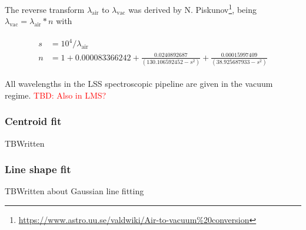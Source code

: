 The reverse transform $\lambda_\textrm{air}$ to $\lambda_\textrm{vac}$ was derived by N. Piskunov\footnote{\url{https://www.astro.uu.se/valdwiki/Air-to-vacuum\%20conversion}}, being $\lambda_\textrm{vac}=\lambda_\textrm{air}*n$ with 

\begin{eqnarray}\label{eq:vac2air}
\left.\begin{aligned}
    s&=10^4 / \lambda_{\textrm{air}}\\
    n&=1 + 0.000083366242 + \frac{0.0240892687}{(130.106592452 - s^2)} + \frac{0.00015997409}{(38.925687933 - s^2)}
\end{aligned}\right.
\end{eqnarray}

All wavelengths in the \ac{LSS} spectroscopic pipeline are given in the vacuum regime. \textcolor{red}{TBD: Also in LMS?}

\subsubsection{Centroid fit}
\label{sssec:centroid}
TBWritten

\subsubsection{Line shape fit}
\label{sssec:linefit}
TBWritten about Gaussian line fitting


